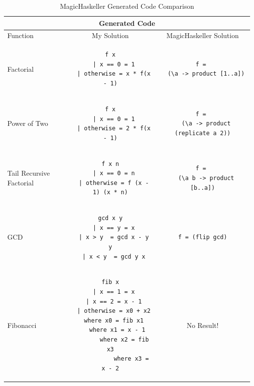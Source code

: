 \begin{table}[h!]
\centering
\begin{tabular}{| m{4em} | c | c |}
\hline
\multicolumn{3}{|c|}{\textbf{Generated Code}} \\
\hline
Function & My Solution & MagicHaskeller Solution \\
\hline
Factorial 
&
\begin{lstlisting}[backgroundcolor = \color{white}]
f x
  | x == 0 = 1
  | otherwise = x * f(x - 1)
\end{lstlisting}
& 
\begin{lstlisting}[backgroundcolor = \color{white}]
f = 
  (\a -> product [1..a])
\end{lstlisting}
\\
\hline
\mbox{}\newline
Power \newline
of \newline
Two \newline
&
\mbox{}\newline
\begin{lstlisting}[backgroundcolor = \color{white}]
f x
  | x == 0 = 1
  | otherwise = 2 * f(x - 1)
\end{lstlisting}
& 
\begin{lstlisting}[backgroundcolor = \color{white}]
f = 
  (\a -> product (replicate a 2))
\end{lstlisting}
\\
\hline
\mbox{}\newline
Tail \newline
Recursive \newline
Factorial \newline
&
\begin{lstlisting}[backgroundcolor = \color{white}]
f x n
  | x == 0 = n
  | otherwise = f (x - 1) (x * n)
\end{lstlisting}
& 
\begin{lstlisting}[backgroundcolor = \color{white}]
f = 
  (\a b -> product [b..a])
\end{lstlisting}
\\
\hline
GCD 
&
\begin{lstlisting}[backgroundcolor = \color{white}]
gcd x y
  | x == y = x
  | x > y  = gcd x - y y
  | x < y  = gcd y x
\end{lstlisting}	
&
\begin{lstlisting}[backgroundcolor = \color{white}]
f = (flip gcd)
\end{lstlisting}
\\
\hline
Fibonacci
&
\begin{lstlisting}[backgroundcolor = \color{white}]
fib x
  | x == 1 = x
  | x == 2 = x - 1
  | otherwise = x0 + x2
  where x0 = fib x1
  	where x1 = x - 1
  		where x2 = fib x3
  			where x3 = x - 2
\end{lstlisting}
&
No Result!
\\
\hline
\end{tabular}
\caption{MagicHaskeller Generated Code Comparison }
\label{table:1}
\end{table}
\Reactivatenumber

